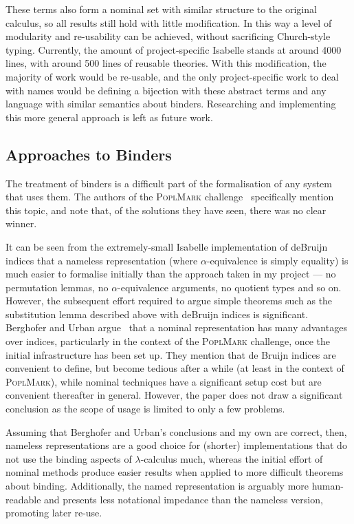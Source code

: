 These terms also form a nominal set with similar structure to the original calculus, so all results still hold with little modification.
In this way a level of modularity and re-usability can be achieved, without sacrificing Church-style typing.
Currently, the amount of project-specific Isabelle stands at around 4000 lines, with around 500 lines of reusable theories.
With this modification, the majority of work would be re-usable, and the only project-specific work to deal with names would be defining a bijection with these abstract terms and any language with similar semantics about binders.
Researching and implementing this more general approach is left as future work.

\subsection{Approaches to Binders}
The treatment of binders is a difficult part of the formalisation of any system that uses them.
The authors of the \textsc{PoplMark} challenge~\cite{poplmark} specifically mention this topic, and note that, of the solutions they have seen, there was no clear winner.

It can be seen from the extremely-small Isabelle implementation of deBruijn indices that a nameless representation (where \(\alpha\)-equivalence is simply equality) is much easier to formalise initially than the approach taken in my project --- no permutation lemmas, no \(\alpha\)-equivalence arguments, no quotient types and so on.
However, the subsequent effort required to argue simple theorems such as the substitution lemma described above with deBruijn indices is significant.
Berghofer and Urban argue~\cite{head-to-head} that a nominal representation has many advantages over indices, particularly in the context of the \textsc{PoplMark} challenge, once the initial infrastructure has been set up.
They mention that de Bruijn indices are convenient to define, but become tedious after a while (at least in the context of \textsc{PoplMark}), while nominal techniques have a significant setup cost but are convenient thereafter in general.
However, the paper does not draw a significant conclusion as the scope of usage is limited to only a few problems.

Assuming that Berghofer and Urban's conclusions and my own are correct, then, nameless representations are a good choice for (shorter) implementations that do not use the binding aspects of \(\lambda\)-calculus much, whereas the initial effort of nominal methods produce easier results when applied to more difficult theorems about binding.
Additionally, the named representation is arguably more human-readable and presents less notational impedance than the nameless version, promoting later re-use.

